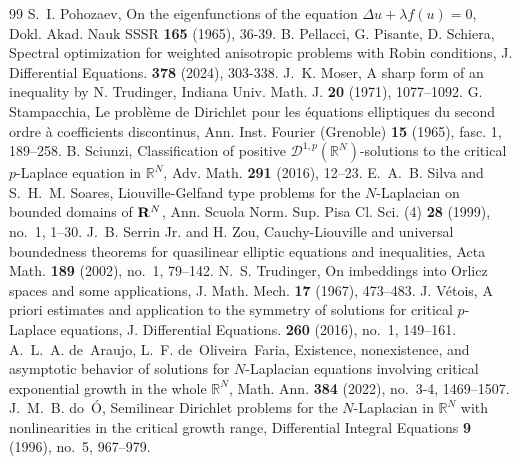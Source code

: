 \documentclass[10pt,a4paper]{amsart}
\numberwithin{equation}{section}
\begin{document}
\begin{thebibliography}{99}
 S.~I. Pohozaev, On the eigenfunctions of the equation $\Delta u+\lambda f(u)=0$, Dokl. Akad. Nauk SSSR {\bf 165} (1965), 36-39.
 B. Pellacci, G. Pisante, D. Schiera, Spectral optimization for weighted anisotropic problems with Robin conditions, J. Differential Equations. {\bf 378} (2024), 303-338.
 J.~K. Moser, A sharp form of an inequality by N. Trudinger, Indiana Univ. Math. J. {\bf 20} (1971), 1077--1092.
 G. Stampacchia, Le probl\`eme de Dirichlet pour les \'equations elliptiques du second ordre \`a{} coefficients discontinus, Ann. Inst. Fourier (Grenoble) {\bf 15} (1965), fasc. 1, 189--258.
 B. Sciunzi, Classification of positive $\mathcal{D}^{1,p}(\mathbb{R}^N)$-solutions to the critical $p$-Laplace equation in $\mathbb{R}^N$, Adv. Math. {\bf 291} (2016), 12--23.
 E.~A.~B. Silva and S.~H.~M. Soares, Liouville-Gelfand type problems for the $N$-Laplacian on bounded domains of ${\bf R}^N$, Ann. Scuola Norm. Sup. Pisa Cl. Sci. (4) {\bf 28} (1999), no.~1, 1--30.
 J.~B. Serrin Jr. and H. Zou, Cauchy-Liouville and universal boundedness theorems for quasilinear elliptic equations and inequalities, Acta Math. {\bf 189} (2002), no.~1, 79--142.
 N.~S. Trudinger, On imbeddings into Orlicz spaces and some applications, J. Math. Mech. {\bf 17} (1967), 473--483.
 J. V\'etois, A priori estimates and application to the symmetry of solutions for critical $p$-Laplace equations, J. Differential Equations. {\bf 260} (2016), no.~1, 149--161.
 A.~L.~A. de~Araujo, L.~F. de~Oliveira~Faria, Existence, nonexistence, and asymptotic behavior of solutions for $N$-Laplacian equations involving critical exponential growth in the whole $\mathbb R^N$, Math. Ann. {\bf 384} (2022), no.~3-4, 1469--1507.
 J.~M.~B. do~\'O, Semilinear Dirichlet problems for the $N$-Laplacian in $\mathbb{R}^N$ with nonlinearities in the critical growth range, Differential Integral Equations {\bf 9} (1996), no.~5, 967--979.
\end{thebibliography}
\end{document}
